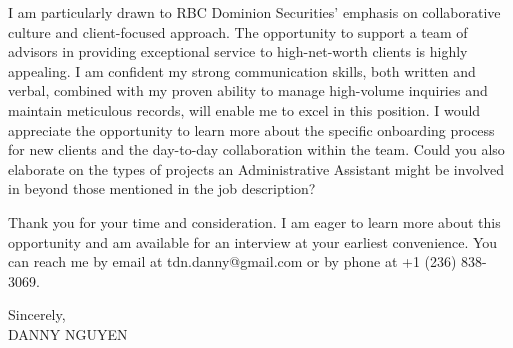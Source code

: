 \documentclass[letterpaper,11pt]{article}
\begin{document}
I am particularly drawn to RBC Dominion Securities' emphasis on collaborative culture and client-focused approach.  The opportunity to support a team of advisors in providing exceptional service to high-net-worth clients is highly appealing. I am confident my strong communication skills, both written and verbal, combined with my proven ability to manage high-volume inquiries and maintain meticulous records, will enable me to excel in this position.  I would appreciate the opportunity to learn more about the specific onboarding process for new clients and the day-to-day collaboration within the team.  Could you also elaborate on the types of projects an Administrative Assistant might be involved in beyond those mentioned in the job description?


\vspace{10pt}

Thank you for your time and consideration. I am eager to learn more about this opportunity and am available for an interview at your earliest convenience.  You can reach me by email at tdn.danny@gmail.com or by phone at +1 (236) 838-3069.


\vspace{20pt}

Sincerely, \\
\vspace{40pt}
DANNY NGUYEN
\end{document}

